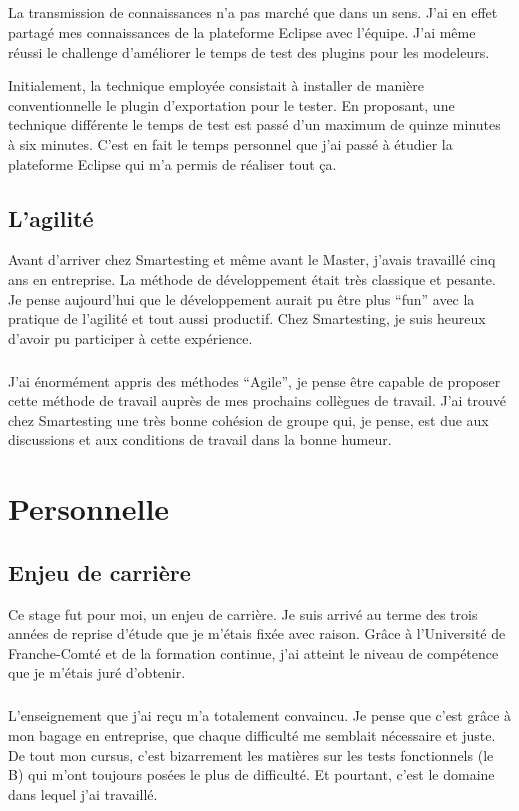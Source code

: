 \subparagraph{}
La transmission de connaissances n'a pas marché que dans un sens.
J'ai en effet partagé mes connaissances de la plateforme Eclipse avec l'équipe.
J'ai même réussi le challenge d'améliorer le temps de test des plugins pour les modeleurs.

Initialement, la technique employée consistait à installer de manière conventionnelle le plugin d'exportation pour le tester.
En proposant, une technique différente le temps de test est passé d'un maximum de quinze minutes à six minutes.
C'est en fait le temps personnel que j'ai passé à étudier la plateforme Eclipse qui m'a permis de réaliser tout ça.

\subsection{L'agilité}
Avant d'arriver chez Smartesting et même avant le Master, j'avais travaillé cinq ans en entreprise.
La méthode de développement était très classique et pesante.
Je pense aujourd'hui que le développement aurait pu être plus ``fun'' avec la pratique de l'agilité et tout aussi productif.
Chez Smartesting, je suis heureux d'avoir pu participer à cette expérience.

\subparagraph*{}
J'ai énormément appris des méthodes ``Agile'', je pense être capable de proposer cette méthode de travail auprès de mes prochains collègues de travail.
J'ai trouvé chez Smartesting une très bonne cohésion de groupe qui, je pense, est due aux discussions et aux conditions de travail dans la bonne humeur.

\section{Personnelle}

\subsection{Enjeu de carrière}

Ce stage fut pour moi, un enjeu de carrière.
Je suis arrivé au terme des trois années de reprise d'étude que je m'étais fixée avec raison.
Grâce à l'Université de Franche-Comté et de la formation continue, j'ai atteint le niveau de compétence que je m'étais juré d'obtenir.

\subparagraph*{}
L'enseignement que j'ai reçu m'a totalement convaincu.
Je pense que c'est grâce à mon bagage en entreprise, que chaque difficulté me semblait nécessaire et juste.
De tout mon cursus, c'est bizarrement les matières sur les tests fonctionnels (le B) qui m'ont toujours posées le plus de difficulté.
Et pourtant, c'est le domaine dans lequel j'ai travaillé.

